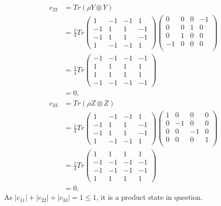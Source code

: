 \documentclass[10pt]{article}
\begin{document}
\begin{align*}
c_{22} &= Tr(\rho Y \otimes Y) \\
          &= \frac{1}{4} Tr
        \begin{pmatrix}
        1 & -1 & -1 & 1 \\
        -1 & 1 & 1 & -1 \\
        -1 & 1 & 1 & -1 \\
        1 & -1 & -1 & 1
        \end{pmatrix}
        \begin{pmatrix}
        0   & 0 & 0 & -1 \\
        0   & 0 & 1 & 0 \\
        0   & 1 & 0 & 0 \\
        -1 & 0 & 0 & 0 \\
        \end{pmatrix} \\
        &= \frac{1}{4} Tr
        \begin{pmatrix}
        -1 & -1 & -1 & -1 \\
        1 & 1 & 1 & 1 \\
        1 & 1 & 1 & 1 \\
        -1 & -1 & -1 & -1
        \end{pmatrix} \\
        &= 0,
\end{align*}
\begin{align*}
c_{33} &= Tr(\rho Z \otimes Z) \\
          &= \frac{1}{4} Tr
        \begin{pmatrix}
        1 & -1 & -1 & 1 \\
        -1 & 1 & 1 & -1 \\
        -1 & 1 & 1 & -1 \\
        1 & -1 & -1 & 1
        \end{pmatrix}
        \begin{pmatrix}
        1 & 0   & 0   & 0 \\
        0 & -1 & 0   & 0 \\
        0 & 0   & -1 & 0 \\
        0 & 0   & 0   & 1 \\
        \end{pmatrix} \\
        &= \frac{1}{4} Tr
        \begin{pmatrix}
        1 & 1 & 1 & 1 \\
        -1 & -1 & -1 & -1 \\
        -1 & -1 & -1 & -1 \\
        1 & 1 & 1 & 1 
        \end{pmatrix} \\
        &= 0.
\end{align*}
As $|c_{11}| + |c_{22}| + |c_{33}| = 1 \leq 1$, it is a product state in question.
\end{document}
